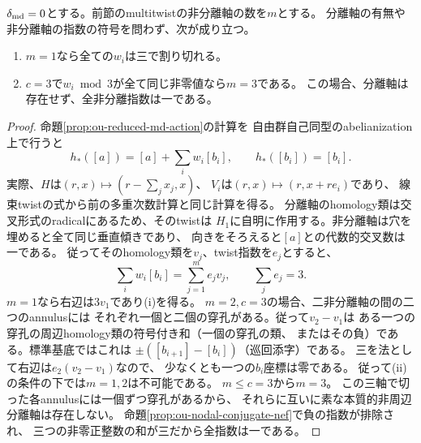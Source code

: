 \begin{lemma}[非分離軸の本数の合同式判定]
\label{lem:ou-nodal-axis-congruences}
$\delta_{\rm md}=0$とする。前節のmultitwistの非分離軸の数を$m$とする。
分離軸の有無や非分離軸の指数の符号を問わず、次が成り立つ。
\begin{enumerate}[label=(\roman*)]
\item $m=1$なら全ての$w_i$は三で割り切れる。
\item $c=3$で$w_i\bmod3$が全て同じ非零値なら$m=3$である。
      この場合、分離軸は存在せず、全非分離指数は一である。
\end{enumerate}
\end{lemma}
\begin{proof}
命題\ref{prop:ou-reduced-md-action}の計算を
自由群自己同型のabelianization上で行うと
\[
 h_*([a])=[a]+\sum_i w_i[b_i],\qquad
 h_*([b_i])=[b_i].
\]
実際、$H$は$(r,x)\mapsto(r-\sum_j x_j,x)$、
$V_i$は$(r,x)\mapsto(r,x+re_i)$であり、
線束twistの式から前の多重次数計算と同じ計算を得る。
分離軸のhomology類は交叉形式のradicalにあるため、そのtwistは
$H_1$に自明に作用する。非分離軸は穴を埋めると全て同じ垂直傾きであり、
向きをそろえると$[a]$との代数的交叉数は一である。
従ってそのhomology類を$v_j$、twist指数を$e_j$とすると、
\[
 \sum_i w_i[b_i]=\sum_{j=1}^m e_j v_j,\qquad
 \sum_j e_j=3 .
\]
$m=1$なら右辺は$3v_1$であり(i)を得る。
$m=2,c=3$の場合、二非分離軸の間の二つのannulusには
それぞれ一個と二個の穿孔がある。従って$v_2-v_1$は
ある一つの穿孔の周辺homology類の符号付き和（一個の穿孔の類、
またはその負）である。標準基底ではこれは
$\pm([b_{i+1}]-[b_i])$（巡回添字）である。
三を法として右辺は$e_2(v_2-v_1)$なので、
少なくとも一つの$b_i$座標は零である。
従って(ii)の条件の下では$m=1,2$は不可能である。
$m\leq c=3$から$m=3$。
この三軸で切った各annulusには一個ずつ穿孔があるから、
それらに互いに素な本質的非周辺分離軸は存在しない。
命題\ref{prop:ou-nodal-conjugate-nef}で負の指数が排除され、
三つの非零正整数の和が三だから全指数は一である。
\end{proof}

